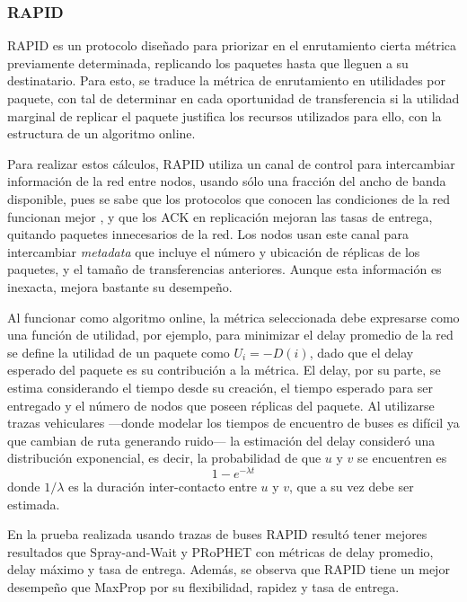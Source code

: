 \subsubsection{RAPID}
RAPID\cite{rapid} es un protocolo diseñado para priorizar en el enrutamiento cierta métrica previamente determinada, replicando los paquetes hasta que lleguen a su destinatario. Para esto, se traduce la métrica de enrutamiento en utilidades por paquete, con tal de determinar en cada oportunidad de transferencia si la utilidad marginal de replicar el paquete justifica los recursos utilizados para ello, con la estructura de un algoritmo online.

Para realizar estos cálculos, RAPID utiliza un canal de control para intercambiar información de la red entre nodos, usando sólo una fracción del ancho de banda disponible, pues se sabe que los protocolos que conocen las condiciones de la red funcionan mejor \cite{rapid19}, y que los ACK en replicación mejoran las tasas de entrega, quitando paquetes innecesarios de la red. Los nodos usan este canal para intercambiar \emph{metadata} que incluye el número y ubicación de réplicas de los paquetes, y el tamaño de transferencias anteriores. Aunque esta información es inexacta, mejora bastante su desempeño.

Al funcionar como algoritmo online, la métrica seleccionada debe expresarse como una función de utilidad, por ejemplo, para minimizar el delay promedio de la red se define la utilidad de un paquete como
$ U_i = -D(i)$,
dado que el delay esperado del paquete es su contribución a la métrica. El delay, por su parte, se estima considerando el tiempo desde su creación, el tiempo esperado para ser entregado y el número de nodos que poseen réplicas del paquete. Al utilizarse trazas vehiculares ---donde modelar los tiempos de encuentro de buses es difícil ya que cambian de ruta generando ruido--- la estimación del delay consideró una distribución exponencial, es decir, la probabilidad de que $u$ y $v$ se encuentren es
$$1-e^{-\lambda t}$$
donde $1/\lambda$ es la duración inter-contacto entre $u$ y $v$, que a su vez debe ser estimada.

En la prueba realizada usando trazas de buses RAPID resultó tener mejores resultados que Spray-and-Wait y PRoPHET con métricas de delay promedio, delay máximo y tasa de entrega. Además, se observa que RAPID tiene un mejor desempeño que MaxProp por su flexibilidad, rapidez y tasa de entrega.
